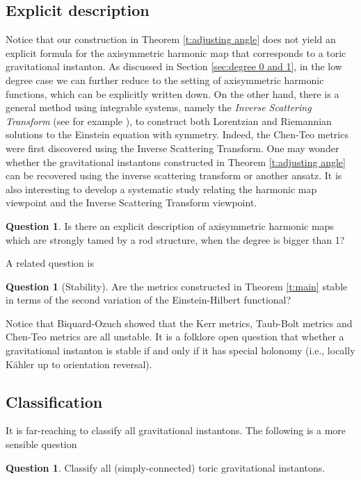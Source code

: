 \documentclass[a4paper,11pt]{amsart}
\theoremstyle{definition}
\newtheorem{question}[theorem]{Question}
\numberwithin{equation}{section}
\DeclareMathOperator{\AFa}{AF_\beta}
\begin{document}
\subsection{Explicit description}
Notice that our construction in Theorem \ref{t:adjusting angle} does not yield an explicit formula for the  axisymmetric harmonic map that corresponds to a toric $\AFa$ gravitational instanton. As discussed in Section \ref{sec:degree 0 and 1}, in the low degree case we 
can further reduce to the setting of axisymmetric harmonic functions, which can be explicitly written down. On the other hand,  there is a general method using integrable systems, namely the \emph{Inverse Scattering Transform} (see for example \cite{BZ}), to construct both Lorentzian and Riemannian solutions to the Einstein equation with symmetry. Indeed, the Chen-Teo metrics were first discovered using the Inverse Scattering Transform. One may wonder whether the gravitational instantons constructed in Theorem \ref{t:adjusting angle} can be recovered using the inverse scattering transform or another ansatz. It is also interesting to develop a systematic study relating the harmonic map viewpoint and the Inverse Scattering Transform viewpoint.

\begin{question}
  Is there an explicit description of axisymmetric harmonic maps which are strongly tamed by a rod structure,  when the degree is bigger than 1?
\end{question}

A related question is 

\begin{question}[Stability]
Are the metrics constructed in Theorem \ref{t:main} stable in terms of the second variation of the Einstein-Hilbert functional?
\end{question}
Notice that Biquard-Ozuch \cite{BO} showed that the Kerr metrics, Taub-Bolt metrics and  Chen-Teo metrics  are all unstable. It is a folklore open question that whether a gravitational instanton is stable if and only if it has special holonomy (i.e., locally K\"ahler up to orientation reversal).



\subsection{Classification}
It is  far-reaching to classify all gravitational instantons. The following is a more sensible question
\begin{question}
    Classify all (simply-connected) toric gravitational instantons. 
\end{question}
\end{document}
